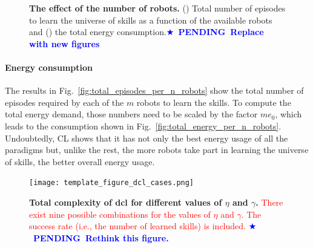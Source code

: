 \documentclass[12pt]{article}
\newcommand\myhl[1]{\textcolor{red}{#1}}
\newcommand*{\pending}[1]{\textcolor{blue}{$\bigstar$~\textbf{PENDING~#1}}}
\begin{document}
\begin{figure}[!t]
\begin{subfigure}[t]{0.45\textwidth}
	\end{subfigure}
	\hspace*{\fill}
	\caption[] {\label{fig:final_results} \textbf{The effect of the number of robots.} () Total number of episodes to learn the universe of skills as a function of the available robots and () the total energy consumption.\pending{Replace with new figures}}
\end{figure}

\paragraph*{Energy consumption}
The results in Fig.~\ref{fig:total_episodes_per_n_robots} show the total number of episodes required by each of the $m$ robots to learn the skills. To compute the total energy demand, those numbers need to be scaled by the factor $m e_0$, which leads to the consumption shown in Fig.~\ref{fig:total_energy_per_n_robots}. Undoubtedly, CL shows that it has not only the best energy usage of all the paradigms but, unlike the rest, the more robots take part in learning the universe of skills, the better overall energy usage.
\begin{figure}[t!]
	\centering
	\hspace*{\fill}
	\texttt{[image: template\_figure\_dcl\_cases.png]}
	\hspace*{\fill}
	\caption[] {\label{fig:dcl_cases_matrix_tmp} \textbf{Total complexity of \ac{dcl} for different values of $\eta$ and $\gamma$.} \myhl{There exist nine possible combinations for the values of $\eta$ and $\gamma$. The success rate (i.e., the number of learned skills) is included.} \pending{Rethink this figure.}}
\end{figure}

\end{document}
